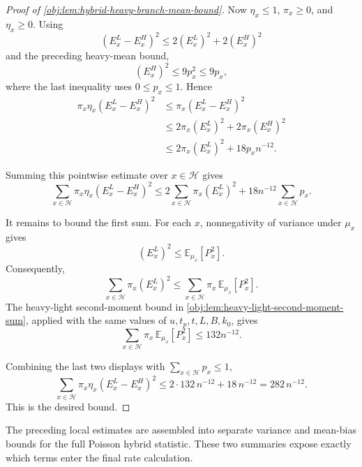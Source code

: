 \documentclass[11pt]{article}
\begin{document}
\begin{proof}[Proof of \cref{obj:lem:hybrid-heavy-branch-mean-bound}]
Now \(\eta_x\le1\), \(\pi_x\ge0\), and \(\eta_x\ge0\). Using
\[
(E^L_x-E^H_x)^2\le 2(E^L_x)^2+2(E^H_x)^2
\]
and the preceding heavy-mean bound,
\[
(E^H_x)^2\le 9p_x^2\le 9p_x,
\]
where the last inequality uses \(0\le p_x\le1\). Hence
\[
\begin{aligned}
\pi_x\eta_x(E^L_x-E^H_x)^2
&\le \pi_x(E^L_x-E^H_x)^2\\
&\le 2\pi_x(E^L_x)^2+2\pi_x(E^H_x)^2\\
&\le 2\pi_x(E^L_x)^2+18p_x n^{-12}.
\end{aligned}
\]

Summing this pointwise estimate over \(x\in\mathcal H\) gives
\[
\sum_{x\in\mathcal H}\pi_x\eta_x(E^L_x-E^H_x)^2
\le
2\sum_{x\in\mathcal H}\pi_x(E^L_x)^2
+
18n^{-12}\sum_{x\in\mathcal H}p_x .
\]

It remains to bound the first sum. For each \(x\), nonnegativity of variance under \(\mu_x\) gives
\[
(E^L_x)^2
\le
\mathbb E_{\mu_x}\!\left[P_x^2\right].
\]
Consequently,
\[
\sum_{x\in\mathcal H}\pi_x(E^L_x)^2
\le
\sum_{x\in\mathcal H}\pi_x\,\mathbb E_{\mu_x}\!\left[P_x^2\right].
\]
The heavy-light second-moment bound in \cref{obj:lem:heavy-light-second-moment-sum}, applied with the same values of \(u,t_p,t,L,B,k_0\), gives
\[
\sum_{x\in\mathcal H}\pi_x\,\mathbb E_{\mu_x}\!\left[P_x^2\right]
\le 132n^{-12}.
\]

Combining the last two displays with \(\sum_{x\in\mathcal H}p_x\le1\),
\[
\sum_{x\in\mathcal H}\pi_x\eta_x(E^L_x-E^H_x)^2
\le
2\cdot132\,n^{-12}+18\,n^{-12}
=
282\,n^{-12}.
\]
This is the desired bound.
\end{proof}

The preceding local estimates are assembled into separate variance and mean-bias bounds for the full Poisson hybrid statistic. These two summaries expose exactly which terms enter the final rate calculation.
\end{document}
